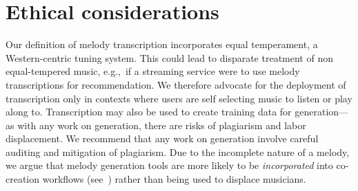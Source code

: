 \vspace{-3mm}
\section{Ethical considerations}

Our definition of melody transcription incorporates equal temperament, a Western-centric tuning system. 
This could lead to disparate treatment of non equal-tempered music, e.g.,~if a streaming service were to use melody transcriptions for recommendation. 
We therefore advocate for the deployment of transcription only in contexts where users are self selecting music to listen or play along to. 
Transcription may also be used to create training data for generation---as with any work on generation, there are risks of plagiarism and labor displacement. 
We recommend that any work on generation involve careful auditing and mitigation of plagiarism. 
Due to the incomplete nature of a melody, we argue that melody generation tools are more likely to be \emph{incorporated} into co-creation workflows (see~\cite{huang2020ai}) rather than being used to displace musicians.